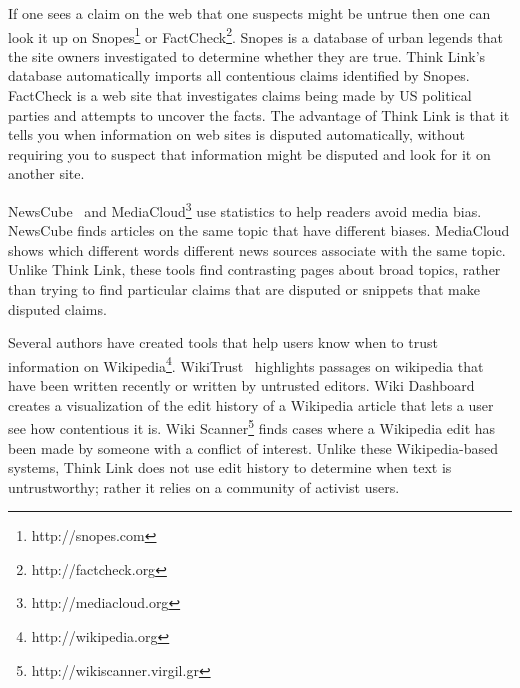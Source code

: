 \documentclass{chi2009}
\newcommand{\todo}[1]{}
\begin{document}
If one sees a claim on the web that one suspects might be untrue then one can look it up on Snopes\footnote{http://snopes.com} or FactCheck\footnote{http://factcheck.org}. Snopes is a database of urban legends that the site owners investigated to determine whether they are true. 
Think Link's database automatically imports all contentious claims identified by Snopes.
FactCheck is a web site that investigates claims being made by US political parties and attempts to uncover the facts. The advantage of Think Link is that it tells you when information on web sites is disputed automatically, without requiring you to suspect that information might be disputed and look for it on another site.



\todo{Make sure we stay in sync}

NewsCube~\cite{Park2009} and MediaCloud\footnote{http://mediacloud.org} use statistics to help readers avoid media bias. NewsCube finds articles on the same topic that have different biases. MediaCloud shows which different words different news sources associate with the same topic. Unlike Think Link, these tools find contrasting pages about broad topics, rather than trying to find particular claims that are disputed or snippets that make disputed claims.

Several authors have created tools that help users know when to trust information on Wikipedia\footnote{http://wikipedia.org}. WikiTrust~\cite{Adler2008a} highlights passages on wikipedia that have been written recently or written by untrusted editors. Wiki Dashboard~\cite{Kittur2008} creates a visualization of the edit history of a Wikipedia article that lets a user see how contentious it is. Wiki Scanner\footnote{http://wikiscanner.virgil.gr} finds cases where a Wikipedia edit has been made by someone with a conflict of interest. Unlike these Wikipedia-based systems, Think Link does not use edit history to determine when text is untrustworthy; rather it relies on a community of activist users.

% 
% 
\end{document}
